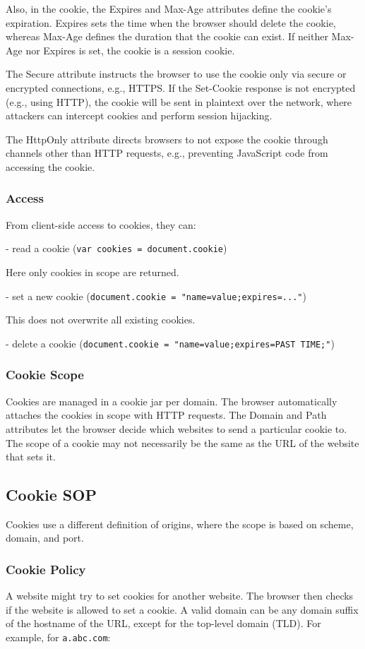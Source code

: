 Also, in the cookie, the Expires and Max-Age attributes define the cookie's expiration. Expires sets the time when the browser should delete the cookie, whereas Max-Age defines the duration that the cookie can exist. If neither Max-Age nor Expires is set, the cookie is a session cookie. 

The Secure attribute instructs the browser to use the cookie only via secure or encrypted connections, e.g., HTTPS. If the Set-Cookie response is not encrypted (e.g., using HTTP), the cookie will be sent in plaintext over the network, where attackers can intercept cookies and perform session hijacking. 

The HttpOnly attribute directs browsers to not expose the cookie through channels other than HTTP requests, e.g., preventing JavaScript code from accessing the cookie. 

\subsubsection{Access}
From client-side access to cookies, they can:

- read a cookie (\texttt{var cookies = document.cookie})

Here only cookies in scope are returned. 

- set a new cookie (\texttt{document.cookie = "name=value;expires=..."})

This does not overwrite all existing cookies. 

- delete a cookie (\texttt{document.cookie = "name=value;expires=PAST TIME;"})

\subsubsection{Cookie Scope}
Cookies are managed in a cookie jar per domain. The browser automatically attaches the cookies in scope with HTTP requests. The Domain and Path attributes let the browser decide which websites to send a particular cookie to. The scope of a cookie may not necessarily be the same as the URL of the website that sets it. 

\subsection{Cookie SOP}
Cookies use a different definition of origins, where the scope is based on scheme, domain, and port. 

\subsubsection{Cookie Policy}
A website might try to set cookies for another website. The browser then checks if the website is allowed to set a cookie. A valid domain can be any domain suffix of the hostname of the URL, except for the top-level domain (TLD). For example, for \texttt{a.abc.com}:

